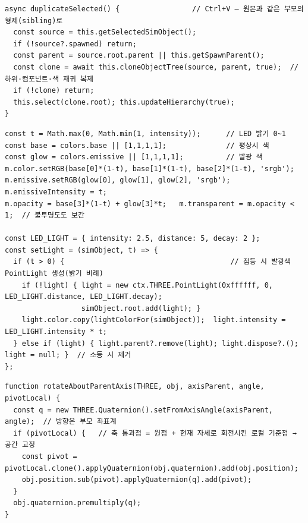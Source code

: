 \begin{verbatim}
async duplicateSelected() {                 // Ctrl+V — 원본과 같은 부모의 형제(sibling)로
  const source = this.getSelectedSimObject();
  if (!source?.spawned) return;
  const parent = source.root.parent || this.getSpawnParent();
  const clone = await this.cloneObjectTree(source, parent, true);  // 하위·컴포넌트·색 재귀 복제
  if (!clone) return;
  this.select(clone.root); this.updateHierarchy(true);
}
\end{verbatim}

\begin{verbatim}
const t = Math.max(0, Math.min(1, intensity));      // LED 밝기 0~1
const base = colors.base || [1,1,1,1];              // 평상시 색
const glow = colors.emissive || [1,1,1,1];          // 발광 색
m.color.setRGB(base[0]*(1-t), base[1]*(1-t), base[2]*(1-t), 'srgb');
m.emissive.setRGB(glow[0], glow[1], glow[2], 'srgb');   m.emissiveIntensity = t;
m.opacity = base[3]*(1-t) + glow[3]*t;   m.transparent = m.opacity < 1;  // 불투명도도 보간

const LED_LIGHT = { intensity: 2.5, distance: 5, decay: 2 };
const setLight = (simObject, t) => {
  if (t > 0) {                                       // 점등 시 발광색 PointLight 생성(밝기 비례)
    if (!light) { light = new ctx.THREE.PointLight(0xffffff, 0, LED_LIGHT.distance, LED_LIGHT.decay);
                  simObject.root.add(light); }
    light.color.copy(lightColorFor(simObject));  light.intensity = LED_LIGHT.intensity * t;
  } else if (light) { light.parent?.remove(light); light.dispose?.(); light = null; }  // 소등 시 제거
};
\end{verbatim}

\begin{verbatim}
function rotateAboutParentAxis(THREE, obj, axisParent, angle, pivotLocal) {
  const q = new THREE.Quaternion().setFromAxisAngle(axisParent, angle);  // 방향은 부모 좌표계
  if (pivotLocal) {   // 축 통과점 = 원점 + 현재 자세로 회전시킨 로컬 기준점 → 공간 고정
    const pivot = pivotLocal.clone().applyQuaternion(obj.quaternion).add(obj.position);
    obj.position.sub(pivot).applyQuaternion(q).add(pivot);
  }
  obj.quaternion.premultiply(q);
}
\end{verbatim}

